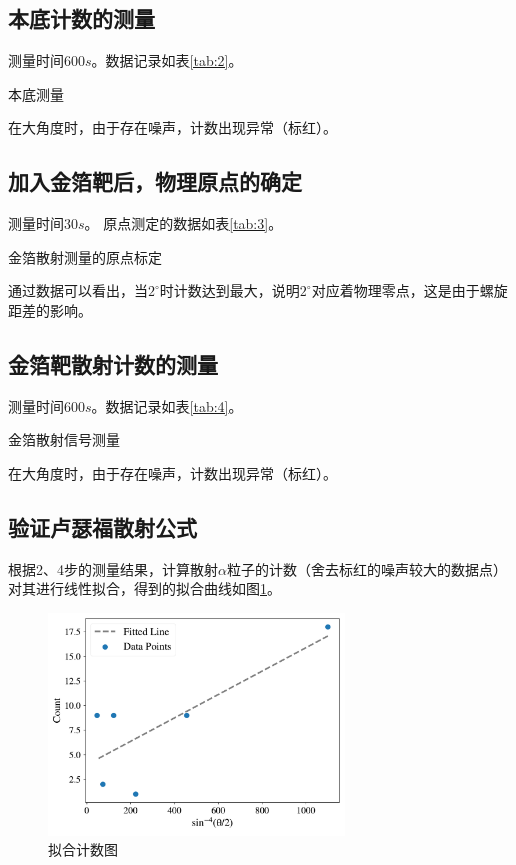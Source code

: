 \documentclass{article}
\begin{document}
\subsection{本底计数的测量}

测量时间$600\si{s}$。数据记录如表\ref{tab:2}。
\begin{table}[htbp]
  \centering
  \caption{本底测量\label{tab:2}}
  
\end{table}

在大角度时，由于存在噪声，计数出现异常（标红）。

\subsection{加入金箔靶后，物理原点的确定}

测量时间$30\si{s}$。
原点测定的数据如表\ref{tab:3}。
\begin{table}[htbp]
  \centering
  \caption{金箔散射测量的原点标定\label{tab:3}}
  
\end{table}
通过数据可以看出，当$2^\circ$时计数达到最大，说明$2^\circ$对应着物理零点，这是由于螺旋距差的影响。

\subsection{金箔靶散射计数的测量}

测量时间$600\si{s}$。数据记录如表\ref{tab:4}。
\begin{table}[htbp]
  \centering
  \caption{金箔散射信号测量\label{tab:4}}
  
\end{table}

在大角度时，由于存在噪声，计数出现异常（标红）。



\subsection{验证卢瑟福散射公式}

根据2、4步的测量结果，计算散射$\alpha$粒子的计数（舍去标红的噪声较大的数据点）对其进行线性拟合，得到的拟合曲线如图\ref{fig:Fit}。
\begin{figure}[htbp]
  \centering
  \includegraphics[width=0.7\textwidth]{../plots/Fit.pdf}
  \caption{拟合计数图\label{fig:Fit}}
\end{figure}
\end{document}
